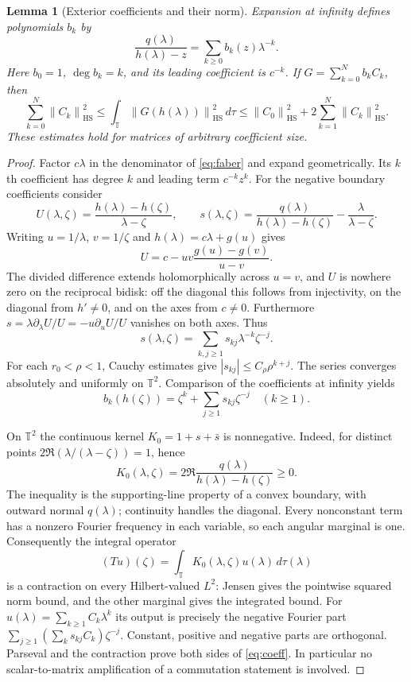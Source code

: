 \documentclass[11pt]{article}
\newtheorem{lemma}[theorem]{Lemma}
\theoremstyle{remark}\newtheorem{remark}[theorem]{Remark}
\newcommand{\HS}{\mathrm{HS}}
\newcommand{\T}{\mathbb T}
\newcommand{\norm}[1]{\left\lVert #1\right\rVert}
\begin{document}
\begin{lemma}[Exterior coefficients and their norm]\label{lem:faber}
Expansion at infinity defines polynomials $b_k$ by
\begin{equation}\label{eq:faber}
\frac{q(\lambda)}{h(\lambda)-z}=\sum_{k\ge0}b_k(z)\lambda^{-k}.
\end{equation}
Here $b_0=1$, $\deg b_k=k$, and its leading coefficient is $c^{-k}$. If $G=\sum_{k=0}^N b_k C_k$, then
\begin{equation}\label{eq:coeff}
\sum_{k=0}^N\norm{C_k}_\HS^2\le
\int_\T\norm{G(h(\lambda))}_\HS^2\,d\tau\le
\norm{C_0}_\HS^2+2\sum_{k=1}^N\norm{C_k}_\HS^2.
\end{equation}
These estimates hold for matrices of arbitrary coefficient size.
\end{lemma}
\begin{proof}
Factor $c\lambda$ in the denominator of \eqref{eq:faber} and expand geometrically. Its $k$th coefficient has degree $k$ and leading term $c^{-k}z^k$. For the negative boundary coefficients consider
\[U(\lambda,\zeta)=\frac{h(\lambda)-h(\zeta)}{\lambda-\zeta},\qquad
s(\lambda,\zeta)=\frac{q(\lambda)}{h(\lambda)-h(\zeta)}-\frac{\lambda}{\lambda-\zeta}.
\]
Writing $u=1/\lambda$, $v=1/\zeta$ and $h(\lambda)=c\lambda+g(u)$ gives
\[U=c-uv\frac{g(u)-g(v)}{u-v}.
\]
The divided difference extends holomorphically across $u=v$, and $U$ is nowhere zero on the reciprocal bidisk: off the diagonal this follows from injectivity, on the diagonal from $h'\ne0$, and on the axes from $c\ne0$. Furthermore
$s=\lambda\partial_\lambda U/U=-u\partial_u U/U$ vanishes on both axes. Thus
\[s(\lambda,\zeta)=\sum_{k,j\ge1}s_{kj}\lambda^{-k}\zeta^{-j}.
\]
For each $r_0<\rho<1$, Cauchy estimates give $|s_{kj}|\le C_\rho\rho^{k+j}$. The series converges absolutely and uniformly on $\T^2$. Comparison of the coefficients at infinity yields
\[b_k(h(\zeta))=\zeta^k+\sum_{j\ge1}s_{kj}\zeta^{-j}\quad(k\ge1).
\]

On $\T^2$ the continuous kernel $K_0=1+s+\bar s$ is nonnegative. Indeed, for distinct points $2\Re(\lambda/(\lambda-\zeta))=1$, hence
\[K_0(\lambda,\zeta)=2\Re\frac{q(\lambda)}{h(\lambda)-h(\zeta)}\ge0.
\]
The inequality is the supporting-line property of a convex boundary, with outward normal $q(\lambda)$; continuity handles the diagonal. Every nonconstant term has a nonzero Fourier frequency in each variable, so each angular marginal is one. Consequently the integral operator
\[(Tu)(\zeta)=\int_\T K_0(\lambda,\zeta)u(\lambda)\,d\tau(\lambda)
\]
is a contraction on every Hilbert-valued $L^2$: Jensen gives the pointwise squared norm bound, and the other marginal gives the integrated bound. For $u(\lambda)=\sum_{k\ge1}C_k\lambda^k$ its output is precisely the negative Fourier part $\sum_{j\ge1}(\sum_k s_{kj}C_k)\zeta^{-j}$. Constant, positive and negative parts are orthogonal. Parseval and the contraction prove both sides of \eqref{eq:coeff}. In particular no scalar-to-matrix amplification of a commutation statement is involved.
\end{proof}
\end{document}
